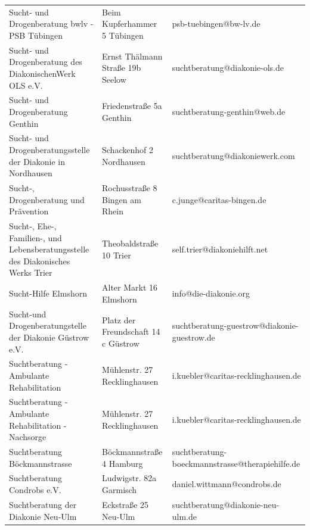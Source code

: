 {\begin{xltabular}{\textwidth} {
 >{\raggedright\arraybackslash}p{5cm}
 >{\raggedright\arraybackslash}X
 >{\raggedright\arraybackslash}p{5cm} }
Sucht- und Drogenberatung bwlv - PSB Tübingen & Beim Kupferhammer 5 Tübingen & psb-tuebingen@bw-lv.de \\
Sucht- und Drogenberatung des DiakonischenWerk OLS e.V. & Ernst Thälmann Straße 19b Seelow & suchtberatung@diakonie-ols.de \\
Sucht- und Drogenberatung Genthin & Friedenstraße 5a Genthin & suchtberatung-genthin@web.de \\
Sucht- und Drogenberatungsstelle der Diakonie in Nordhausen & Schackenhof 2 Nordhausen & suchtberatung@diakoniewerk.com \\
Sucht-, Drogenberatung und Prävention & Rochusstraße 8 Bingen am Rhein & c.junge@caritas-bingen.de \\
Sucht-, Ehe-, Familien-, und Lebensberatungsstelle des Diakonisches Werks Trier & Theobaldstraße 10 Trier & self.trier@diakoniehilft.net \\
Sucht-Hilfe Elmshorn & Alter Markt 16 Elmshorn & info@die-diakonie.org \\
Sucht-und Drogenberatungstelle der Diakonie Güstrow e.V. & Platz der Freundschaft 14 c Güstrow & suchtberatung-guestrow@diakonie-guestrow.de \\
Suchtberatung - Ambulante Rehabilitation & Mühlenstr. 27 Recklinghausen & i.kuebler@caritas-recklinghausen.de \\
Suchtberatung - Ambulante Rehabilitation - Nachsorge & Mühlenstr. 27 Recklinghausen & i.kuebler@caritas-recklinghausen.de \\
Suchtberatung Böckmannstrasse & Böckmannstraße 4 Hamburg & suchtberatung-boeckmannstrasse@therapiehilfe.de \\
Suchtberatung Condrobs e.V. & Ludwigstr. 82a Garmisch & daniel.wittmann@condrobs.de \\
Suchtberatung der Diakonie Neu-Ulm & Eckstraße 25 Neu-Ulm & suchtberatung@diakonie-neu-ulm.de \\

\end{xltabular}}
